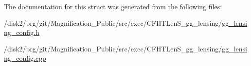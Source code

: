 The documentation for this struct was generated from the following files\+:\begin{DoxyCompactItemize}
\item 
/disk2/brg/git/\+Magnification\+\_\+\+Public/src/exec/\+C\+F\+H\+T\+Len\+S\+\_\+gg\+\_\+lensing/\hyperlink{gg__lensing__config_8h}{gg\+\_\+lensing\+\_\+config.\+h}\item 
/disk2/brg/git/\+Magnification\+\_\+\+Public/src/exec/\+C\+F\+H\+T\+Len\+S\+\_\+gg\+\_\+lensing/\hyperlink{gg__lensing__config_8cpp}{gg\+\_\+lensing\+\_\+config.\+cpp}\end{DoxyCompactItemize}
